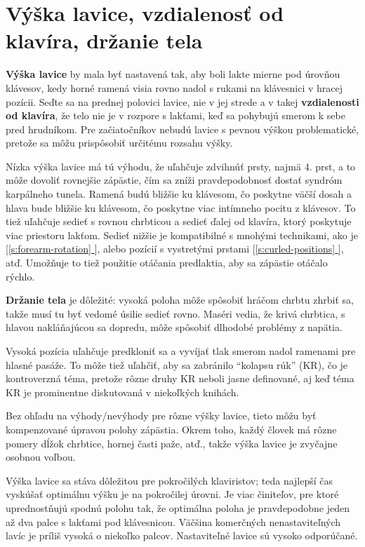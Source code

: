 \documentclass[11pt,a4paper]{book}
\newcommand*{\fullref}[1]{\hyperref[{#1}]{\ref*{#1} \nameref*{#1}}} %
\newcommand*{\fullrefp}[1]{[\fullref{#1}]} %
\begin{document}
\section{Výška lavice, vzdialenosť od klavíra, držanie tela}
\textbf{Výška lavice} by mala byť nastavená tak, aby boli lakte mierne pod úrovňou klávesov, kedy horné ramená visia rovno nadol s rukami na klávesnici v hracej pozícii. Seďte sa na prednej polovici lavice, nie v jej strede a v takej \textbf{vzdialenosti od klavíra}, že telo nie je v rozpore s lakťami, keď sa pohybujú smerom k sebe pred hrudníkom. Pre začiatočníkov nebudú lavice s pevnou výškou problematické, pretože sa môžu prispôsobiť určitému rozsahu výšky.

Nízka výška lavice má tú výhodu, že uľahčuje zdvihnúť prsty, najmä 4. prst, a to môže dovoliť rovnejšie zápästie, čím sa zníži pravdepodobnosť dostať syndróm karpálneho tunela. Ramená budú bližšie ku klávesom, čo poskytne väčší dosah a hlava bude bližšie ku klávesom, čo poskytne viac intímneho pocitu z klávesov. To tiež uľahčuje sedieť s rovnou chrbticou a sedieť ďalej od klavíra, ktorý poskytuje viac priestoru lakťom. Sedieť nižšie je kompatibilné s mnohými technikami, ako je \fullrefp{s:forearm-rotation}, alebo pozícií s vystretými prstami \fullrefp{s:curled-positions}, atď. Umožňuje to tiež použitie otáčania predlaktia, aby sa zápästie otáčalo rýchlo.

\textbf{Držanie tela} je dôležité: vysoká poloha môže spôsobiť hráčom chrbtu zhrbiť sa, takže musí tu byť vedomé úsilie sedieť rovno. Maséri vedia, že krivá chrbtica, s hlavou nakláňajúcou sa dopredu, môže spôsobiť dlhodobé problémy z napätia.

Vysoká pozícia uľahčuje predkloniť sa a vyvíjať tlak smerom nadol ramenami pre hlasné pasáže. To môže tiež uľahčiť, aby sa zabránilo “kolapsu rúk” (KR), čo je kontroverzná téma, pretože rôzne druhy KR neboli jasne definované, aj keď téma KR je prominentne diskutovaná v niekoľkých knihách.

Bez ohľadu na výhody/nevýhody pre rôzne výšky lavice, tieto môžu byť kompenzované úpravou polohy zápästia. Okrem toho, každý človek má rôzne pomery dĺžok chrbtice, hornej časti paže, atď., takže výška lavice je zvyčajne osobnou voľbou.

Výška lavice sa stáva dôležitou pre pokročilých klaviristov; teda najlepší čas vyskúšať optimálnu výšku je na pokročilej úrovni. Je viac činiteľov, pre ktoré uprednostňujú spodnú polohu tak, že optimálna poloha je pravdepodobne jeden až dva palce s lakťami pod klávesnicou. Väčšina komerčných nenastaviteľných lavíc je príliš vysoká o niekoľko palcov. Nastaviteľné lavice sú vysoko odporúčané.
\end{document}
